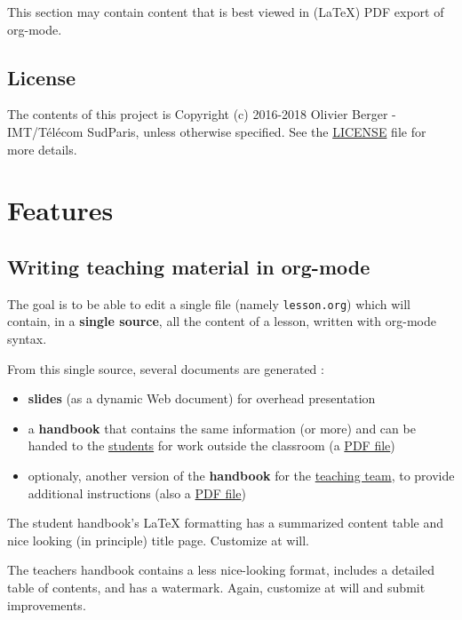 \documentclass[a4paper]{article}
\newenvironment{NOTES}{\begin{lrbox}{\mybox}\begin{minipage}{0.9\textwidth}\begin{shaded}}{\end{shaded}\end{minipage}\end{lrbox}\fbox{\usebox{\mybox}}}
\begin{document}
This section may contain content that is best viewed in (\LaTeX{}) PDF export of org-mode.

\subsection{License}
\label{sec:orgaf9cc58}

The contents of this project is Copyright (c) 2016-2018 Olivier
Berger - IMT/Télécom SudParis, unless otherwise specified. See the
\url{LICENSE} file for more details.

\section{Features}
\label{sec:orgf64dcfc}
\subsection{Writing teaching material in org-mode}
\label{sec:org0c57688}

The goal is to be able to edit a single file (namely \texttt{lesson.org})
which will contain, in a \textbf{single source}, all the content of a lesson,
written with org-mode syntax.

From this single source, several documents are generated :
\begin{itemize}
\item \textbf{slides} (as a dynamic Web document) for overhead presentation
\item a \textbf{handbook} that contains the same information (or more) and can be
handed to the \uline{students} for work outside the classroom (a \href{handbook.pdf}{PDF file})
\end{itemize}

\begin{itemize}
\item optionaly, another version of the \textbf{handbook} for the \uline{teaching team}, to provide additional instructions (also a \href{teacher-handbook.pdf}{PDF file})
\end{itemize}

\begin{NOTES}
The student handbook's \LaTeX{} formatting has a summarized content table and nice looking (in principle) title page. Customize at will.

The teachers handbook contains a less nice-looking format, includes a detailed table of contents, and has a watermark. Again, customize at will and submit improvements.
\end{NOTES}
\end{document}
